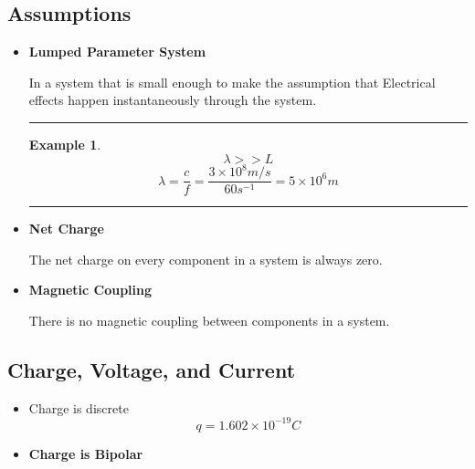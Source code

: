 \documentclass[12pt]{article}
\newtheorem{example}{Example}
\newenvironment{examp}
{\vspace{0.5cm}
 \hrule
\vspace{0.5cm}
\begin{example}}
{\hrule
\vspace{0.5cm}
\end{example}}
\begin{document}
\subsection*{Assumptions}
\begin{itemize}
	\item \textbf{Lumped Parameter System}

	      In a system that is small enough to make the assumption that Electrical
	      effects happen instantaneously through the system.
	      \begin{examp}
		      \[
			      \lambda>>L \]
		      \[
			      \lambda = \frac{c}{f} = \frac{3\times10^8 m/s}{60s^{-1}} = 5\times10^6m
		      \]
	      \end{examp}
	\item \textbf{Net Charge}

	      The net charge on every component in a system is always zero.
	\item \textbf{Magnetic Coupling}

	      There is no magnetic coupling between components in a system.
\end{itemize}
\subsection*{Charge, Voltage, and Current}
\begin{itemize}
	\item Charge is discrete
	      \[q = 1.602\times10^{-19}C\]
	\item \textbf{Charge is Bipolar}
\end{itemize}
\end{document}
